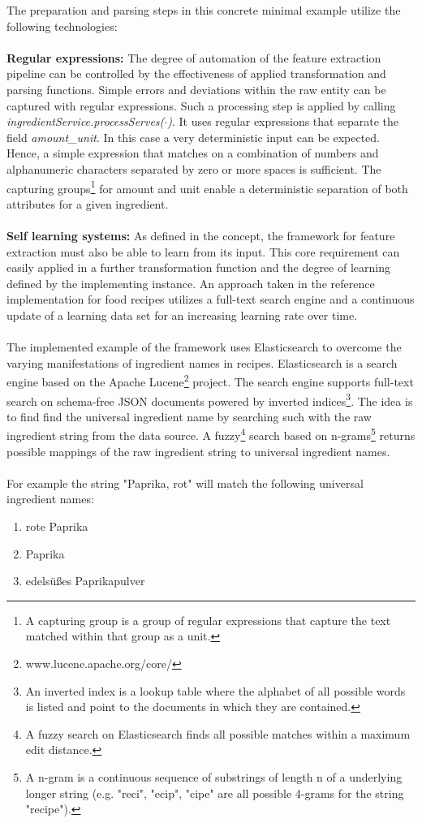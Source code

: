 \noindent The preparation and parsing steps in this concrete minimal example utilize the following technologies:
\\\\
\textbf{Regular expressions:}
The degree of automation of the feature extraction pipeline can be controlled by the effectiveness of applied transformation and parsing functions. Simple errors and deviations within the raw entity can be captured with regular expressions. Such a processing step is applied by calling \textit{ingredientService.processServes($\cdot$)}. It uses regular expressions that separate the field \textit{amount\_unit}. In this case a very deterministic input can be expected. Hence, a simple expression that matches on a combination of numbers and alphanumeric characters separated by zero or more spaces is sufficient. The capturing groups\footnote{A capturing group is a group of regular expressions that capture the text matched within that group as a unit.} for amount and unit enable a deterministic separation of both attributes for a given ingredient.
\\\\
\textbf{Self learning systems:}
As defined in the concept, the framework for feature extraction must also be able to learn from its input. This core requirement can easily applied in a further transformation function and the degree of learning defined by the implementing instance. An approach taken in the reference implementation for food recipes utilizes a full-text search engine and a continuous update of a learning data set for an increasing learning rate over time. 
\\\\
The implemented example of the framework uses Elasticsearch\cite{elasticsearch_2017} to overcome the varying manifestations of ingredient names in recipes. Elasticsearch is a search engine based on the Apache Lucene\footnote{www.lucene.apache.org/core/} project. The search engine supports full-text search on schema-free JSON documents powered by inverted indices\footnote{An inverted index is a lookup table where the alphabet of all possible words is listed and point to the documents in which they are contained.}. The idea is to find find the universal ingredient name by searching such with the raw ingredient string from the data source. A fuzzy\footnote{A fuzzy search on Elasticsearch finds all possible matches within a maximum edit distance.} search based on n-grams\footnote{A n-gram is a continuous sequence of substrings of length n of a underlying longer string (e.g. "reci", "ecip", "cipe" are all possible 4-grams for the string "recipe").} returns possible mappings of the raw ingredient string to universal ingredient names. 
\\\\
For example the string "Paprika, rot" will match the following universal ingredient names:
\begin{enumerate}
\item rote Paprika
\item Paprika
\item edelsüßes Paprikapulver
\end{enumerate}

